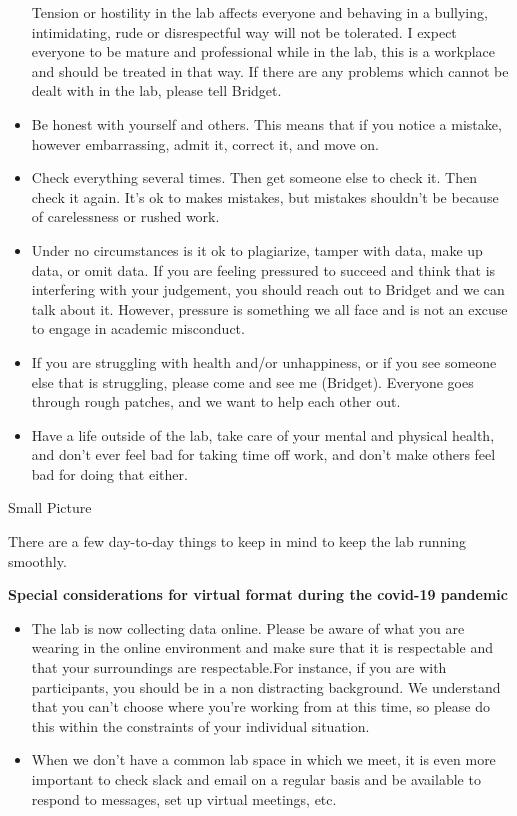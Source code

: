 \documentclass[]{book}
\providecommand{\tightlist}{%
  \setlength{\itemsep}{0pt}\setlength{\parskip}{0pt}}
\begin{document}
\begin{itemize}
  Tension or hostility in the lab affects everyone and behaving in a bullying, intimidating, rude or disrespectful way will not be tolerated. I expect everyone to be mature and professional while in the lab, this is a workplace and should be treated in that way. If there are any problems which cannot be dealt with in the lab, please tell Bridget.
\item
  Be honest with yourself and others. This means that if you notice a mistake, however embarrassing, admit it, correct it, and move on.
\item
  Check everything several times. Then get someone else to check it. Then check it again. It's ok to makes mistakes, but mistakes shouldn't be because of carelessness or rushed work.
\item
  Under no circumstances is it ok to plagiarize, tamper with data, make up data, or omit data. If you are feeling pressured to succeed and think that is interfering with your judgement, you should reach out to Bridget and we can talk about it. However, pressure is something we all face and is not an excuse to engage in academic misconduct.
\item
  If you are struggling with health and/or unhappiness, or if you see someone else that is struggling, please come and see me (Bridget). Everyone goes through rough patches, and we want to help each other out.
\item
  Have a life outside of the lab, take care of your mental and physical health, and don't ever feel bad for taking time off work, and don't make others feel bad for doing that either.
\end{itemize}

Small Picture

There are a few day-to-day things to keep in mind to keep the lab running smoothly.

\textbf{Special considerations for virtual format during the covid-19 pandemic}

\begin{itemize}
\tightlist
\item
  The lab is now collecting data online. Please be aware of what you are wearing in the online environment and make sure that it is respectable and that your surroundings are respectable.For instance, if you are with participants, you should be in a non distracting background. We understand that you can't choose where you're working from at this time, so please do this within the constraints of your individual situation.
\item
  When we don't have a common lab space in which we meet, it is even more important to check slack and email on a regular basis and be available to respond to messages, set up virtual meetings, etc.
\end{itemize}
\end{document}

